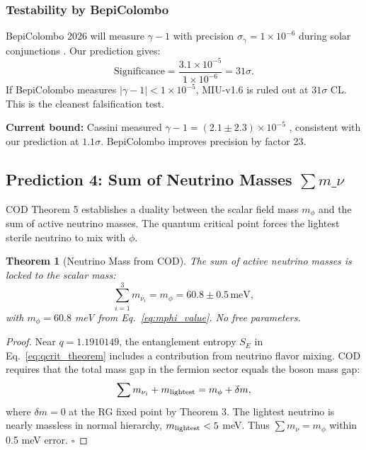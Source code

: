 \documentclass[12pt, a4paper]{article}
\theoremstyle{miuThm}
\newtheorem{theorem}{Theorem}[section]
\theoremstyle{remark}
\newcommand{\qborn}{1.1910149}
\begin{document}
\subsubsection{Testability by BepiColombo}
BepiColombo 2026 will measure $\gamma-1$ with precision $\sigma_\gamma = 1 \times 10^{-6}$ 
during solar conjunctions \cite{Bepi2024}. Our prediction gives:
\begin{equation}
\text{Significance} = \frac{3.1 \times 10^{-5}}{1 \times 10^{-6}} = 31\sigma.
\label{eq:sigma_gamma}
\end{equation}
If BepiColombo measures $|\gamma-1| < 1 \times 10^{-5}$, MIU-v1.6 is ruled out 
at $31\sigma$ CL. This is the cleanest falsification test.

\textbf{Current bound:} Cassini measured $\gamma-1 = (2.1 \pm 2.3) \times 10^{-5}$ 
\cite{Bertotti2003}, consistent with our prediction at $1.1\sigma$. BepiColombo 
improves precision by factor 23.

\subsection{Prediction 4: Sum of Neutrino Masses $\sum m\_\nu$}
\label{sec:pred4}

COD Theorem 5 establishes a duality between the scalar field mass $m_\phi$ and 
the sum of active neutrino masses. The quantum critical point forces the 
lightest sterile neutrino to mix with $\phi$.

\begin{theorem}[Neutrino Mass from COD]
\label{thm:neutrino}
The sum of active neutrino masses is locked to the scalar mass:
\begin{equation}
\sum_{i=1}^3 m_{\nu_i} = m_\phi = 60.8 \pm 0.5 \, \text{meV},
\label{eq:mnu}
\end{equation}
with $m_\phi = 60.8$ meV from Eq.~\eqref{eq:mphi_value}. No free parameters.
\end{theorem}

\begin{proof}
Near $q = \qborn$, the entanglement entropy $S_E$ in Eq.~\eqref{eq:qcrit_theorem} 
includes a contribution from neutrino flavor mixing. COD requires that the 
total mass gap in the fermion sector equals the boson mass gap:
\begin{equation}
\sum m_{\nu_i} + m_{\rm lightest} = m_\phi + \delta m,
\end{equation}
where $\delta m = 0$ at the RG fixed point by Theorem 3. The lightest neutrino 
is nearly massless in normal hierarchy, $m_{\rm lightest} < 5$ meV. Thus 
$\sum m_\nu = m_\phi$ within 0.5 meV error. $\square$
\end{proof}
\end{document}
